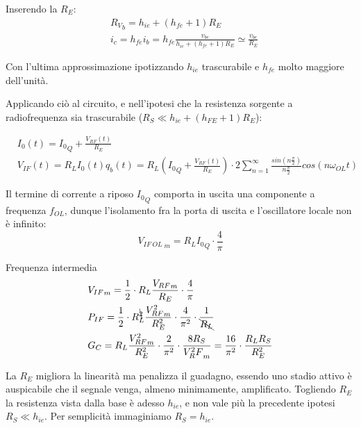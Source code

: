 Inserendo la $R_E$:
\begin{align*}
&{R_V}_b = h_{ie}+(h_{fe}+1)R_E\\
&i_c=h_{fe}i_b=h_{fe}\frac{v_{be}}{h_{ie}+(h_{fe}+1)R_E}\simeq \frac{v_{be}}{R_E}
\end{align*}

Con l'ultima approssimazione ipotizzando $h_{ie}$ trascurabile e $h_{fe}$ molto maggiore dell'unità.

Applicando ciò al circuito, e nell'ipotesi che la resistenza sorgente a radiofrequenza sia trascurabile ($R_S \ll h_{ie} + (h_{FE}+1)R_E$):

\begin{align*}
&I_0 (t) = {I_0}_Q + \frac{V_{RF}(t)}{R_E}\\
&V_{IF}(t) = R_L I_0(t) q_b(t) = R_L \left( {I_0}_Q + \frac{V_{RF}(t)}{R_E} \right) \cdot 2 \sum_{n=1}^{\infty}\frac{sin \left( n \frac{\pi}{2} \right)}{n \frac{\pi}{2}} cos(n \omega_{OL} t)
\end{align*}

Il termine di corrente a riposo ${I_0}_Q$ comporta in uscita una componente a frequenza $f_{OL}$, dunque l'isolamento fra la porta di uscita e l'oscillatore locale non è infinito:
$${V_{IF~OL~}}_m = R_L {I_0}_Q \cdot \frac{4}{\pi}$$

Frequenza intermedia
\begin{align*}
&{V_{IF}}_m = \frac{1}{2} \cdot R_L \frac{{V_{RF}}_m}{R_E} \cdot \frac{4}{\pi}\\
&P_{IF}=\frac{1}{2} \cdot  R_L^{\bcancel{2}} \frac{{V^2_{RF}}_m}{R^2_E} \cdot \frac{4}{\pi^2} \cdot \frac{1}{\bcancel{R_L}}\\
&G_C = R_L \frac{{V^2_{RF}}_m}{R^2_E} \cdot \frac{2}{\pi^2} \cdot \frac{8 R_S}{{V^2_RF}_m} = \frac{16}{\pi^2} \cdot \frac{R_L R_S}{R^2_E}
\end{align*}

La $R_E$ migliora la linearità ma penalizza il guadagno, essendo uno stadio attivo è auspicabile che il segnale venga, almeno minimamente, amplificato. Togliendo $R_E$ la resistenza vista dalla base è adesso $h_{ie}$, e non vale più la precedente ipotesi $R_S\ll h_{ie}$. Per semplicità immaginiamo $R_S = h_{ie}$.

